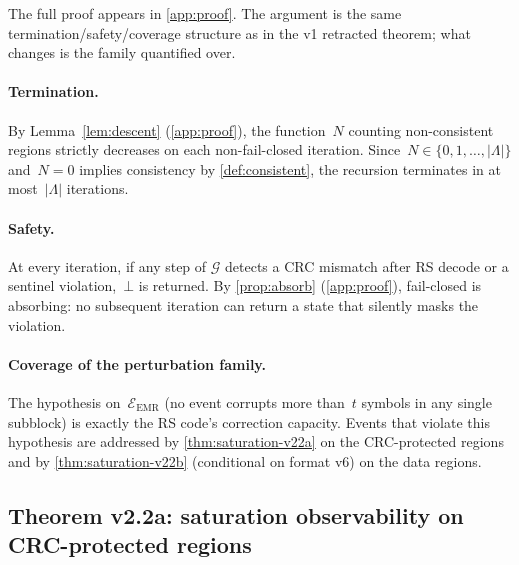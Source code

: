 The full proof appears in \cref{app:proof}. The argument is the
same termination/safety/coverage structure as in the v1 retracted
theorem; what changes is the family quantified over.

\paragraph{Termination.}
By Lemma~\ref{lem:descent} (\cref{app:proof}), the function~\(N\)
counting non-consistent regions strictly decreases on each
non-fail-closed iteration. Since~\(N \in \{0, 1, \dots, |\Lambda|\}\)
and~\(N = 0\) implies consistency by \cref{def:consistent}, the
recursion terminates in at most~\(|\Lambda|\) iterations.

\paragraph{Safety.}
At every iteration, if any step of \(\mathcal{G}\) detects a CRC
mismatch after RS decode or a sentinel violation,~\(\bot\) is
returned. By \cref{prop:absorb} (\cref{app:proof}), fail-closed is
absorbing: no subsequent iteration can return a state that
silently masks the violation.

\paragraph{Coverage of the perturbation family.}
The hypothesis on~\(\mathcal{E}_{\mathrm{EMR}}\) (no event corrupts
more than~\(t\) symbols in any single subblock) is exactly the RS
code's correction capacity. Events that violate this hypothesis
are addressed by \cref{thm:saturation-v22a} on the CRC-protected
regions and by \cref{thm:saturation-v22b} (conditional on format
v6) on the data regions.

\subsection{Theorem v2.2a: saturation observability on CRC-protected regions}

